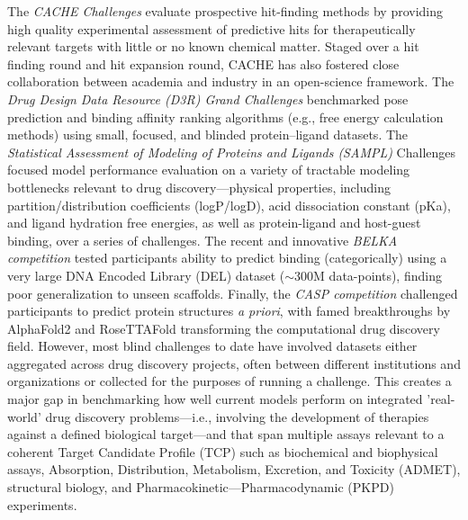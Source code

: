 \documentclass[journal=jcim,manuscript=article]{achemso}
\begin{document}
The \textit{CACHE Challenges}\cite{ackloo_al-awar_amaro_arrowsmith_azevedo_al._2022} evaluate prospective hit-finding methods by providing high quality experimental assessment of predictive hits for therapeutically relevant targets with little or no known chemical matter. Staged over a hit finding round and hit expansion round, CACHE has also fostered close collaboration between academia and industry in an open-science framework. The \textit{Drug Design Data Resource (D3R) Grand Challenges}\cite{parks_gaieb_chiu_yang_shao_walters_jansen_mcgaughey_lewis_bembenek_et} benchmarked pose prediction and binding affinity ranking algorithms (e.g., free energy calculation methods) using small, focused, and blinded protein–ligand datasets. The \textit{Statistical Assessment of Modeling of Proteins and Ligands (SAMPL)} Challenges\cite{sampl6_2018, sampl7_2022, sampl8_2022, sampl9_2024} focused model performance evaluation on a variety of tractable modeling bottlenecks relevant to drug discovery---physical properties, including partition/distribution coefficients (logP/logD), acid dissociation constant (pKa), and ligand hydration free energies, as well as protein-ligand and host-guest binding, over a series of challenges. The recent and innovative \textit{BELKA competition}\cite{quigley2024belka} tested participants ability to predict binding (categorically) using a very large DNA Encoded Library (DEL) dataset ($\sim$300M data-points), finding poor generalization to unseen scaffolds. Finally, the \textit{CASP competition}\cite{casp13_2019, casp14_2021, casp15_2023} challenged participants to predict protein structures \textit{a priori}, with famed breakthroughs by AlphaFold2 and RoseTTAFold transforming the computational drug discovery field\cite{jumper_evans_pritzel_green_figurnov_ronneberger_tunyasuvunakool_bates_žídek_2021, baek_2021}. However, most blind challenges to date have involved datasets either aggregated across drug discovery projects, often between different institutions and organizations or collected for the purposes of running a challenge. This creates a major gap in benchmarking how well current models perform on integrated 'real-world' drug discovery problems---i.e., involving the development of therapies against a defined biological target---and that span multiple assays relevant to a coherent Target Candidate Profile (TCP) such as biochemical and biophysical assays, Absorption, Distribution, Metabolism, Excretion, and Toxicity (ADMET), structural biology, and Pharmacokinetic—Pharmacodynamic (PKPD) experiments\cite{wognum_call_2024, volkamer_machine_2023}.
\end{document}
